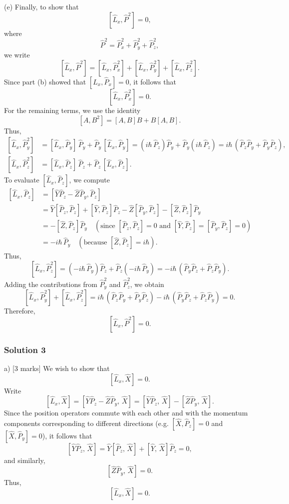 \documentclass{article}
\begin{document}
(e) Finally, to show that 
\[
[\hat{L}_x, \hat{P}^2] = 0,
\]
where 
\[
\hat{P}^2 = \hat{P}_x^2 + \hat{P}_y^2 + \hat{P}_z^2,
\]
we write
\[
[\hat{L}_x, \hat{P}^2] = [\hat{L}_x, \hat{P}_x^2] + [\hat{L}_x, \hat{P}_y^2] + [\hat{L}_x, \hat{P}_z^2].
\]
Since part (b) showed that $[\hat{L}_x,\hat{P}_x] = 0$, it follows that
\[
[\hat{L}_x,\hat{P}_x^2] = 0.
\]
For the remaining terms, we use the identity 
\[
[A, B^2] = [A,B]B + B[A,B].
\]
Thus,
\[
\begin{aligned}
[\hat{L}_x, \hat{P}_y^2] &= [\hat{L}_x,\hat{P}_y]\,\hat{P}_y + \hat{P}_y\,[\hat{L}_x,\hat{P}_y] 
= (i\hbar\,\hat{P}_z)\hat{P}_y + \hat{P}_y(i\hbar\,\hat{P}_z)
= i\hbar\,(\hat{P}_z\hat{P}_y + \hat{P}_y\hat{P}_z),\\[1mm]
[\hat{L}_x, \hat{P}_z^2] &= [\hat{L}_x,\hat{P}_z]\,\hat{P}_z + \hat{P}_z\,[\hat{L}_x,\hat{P}_z].
\end{aligned}
\]
To evaluate $[\hat{L}_x,\hat{P}_z]$, we compute
\[
\begin{aligned}
[\hat{L}_x,\hat{P}_z] &= [\hat{Y}\hat{P}_z - \hat{Z}\hat{P}_y, \hat{P}_z] \\
&= \hat{Y}[\hat{P}_z,\hat{P}_z] + [\hat{Y},\hat{P}_z]\hat{P}_z - \hat{Z}[\hat{P}_y,\hat{P}_z] - [\hat{Z},\hat{P}_z]\hat{P}_y\\[1mm]
&= -[\hat{Z},\hat{P}_z]\hat{P}_y \quad (\text{since } [\hat{P}_z,\hat{P}_z]=0 \text{ and } [\hat{Y},\hat{P}_z]=[\hat{P}_y,\hat{P}_z]=0)\\[1mm]
&= -i\hbar\,\hat{P}_y \quad (\text{because } [\hat{Z},\hat{P}_z]=i\hbar).
\end{aligned}
\]
Thus,
\[
[\hat{L}_x, \hat{P}_z^2] = (-i\hbar\,\hat{P}_y)\hat{P}_z + \hat{P}_z(-i\hbar\,\hat{P}_y)
= -i\hbar\,(\hat{P}_y\hat{P}_z + \hat{P}_z\hat{P}_y).
\]
Adding the contributions from $\hat{P}_y^2$ and $\hat{P}_z^2$, we obtain
\[
[\hat{L}_x,\hat{P}_y^2] + [\hat{L}_x,\hat{P}_z^2] = i\hbar\,(\hat{P}_z\hat{P}_y + \hat{P}_y\hat{P}_z) - i\hbar\,(\hat{P}_y\hat{P}_z + \hat{P}_z\hat{P}_y) = 0.
\]
Therefore,
\[
[\hat{L}_x, \hat{P}^2] = 0.
\]

\subsubsection{Solution 3}

a) [3 marks]
We wish to show that
\[
\left[\hat{L}_x, \hat{X}\right] = 0.
\]
Write
\[
\left[\hat{L}_x, \hat{X}\right] = \left[\hat{Y}\hat{P}_z - \hat{Z}\hat{P}_y,\, \hat{X}\right] 
= \left[\hat{Y}\hat{P}_z,\, \hat{X}\right] - \left[\hat{Z}\hat{P}_y,\, \hat{X}\right].
\]
Since the position operators commute with each other and with the momentum components corresponding to different directions (e.g. \([\hat{X}, \hat{P}_z] = 0\) and \([\hat{X}, \hat{P}_y] = 0\)), it follows that
\[
\left[\hat{Y}\hat{P}_z,\, \hat{X}\right] = \hat{Y}\left[\hat{P}_z,\, \hat{X}\right] + \left[\hat{Y},\, \hat{X}\right]\hat{P}_z = 0,
\]
and similarly,
\[
\left[\hat{Z}\hat{P}_y,\, \hat{X}\right] = 0.
\]
Thus, 
\[
\left[\hat{L}_x, \hat{X}\right] = 0.
\]
\end{document}
